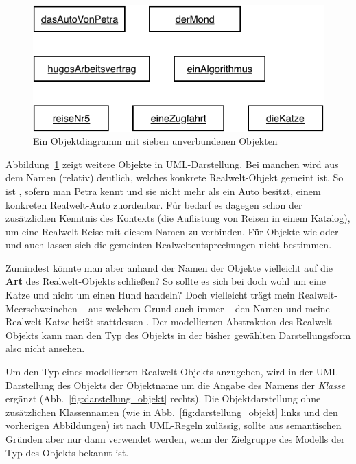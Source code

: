 \vspace{2mm} %

\begin{figure}[h!]
	\centering
	\includegraphics{Bilder/Kapitel-4/objektdiagramm_unverbundene_objekte.pdf}
	\caption{Ein Objektdiagramm mit sieben unverbundenen Objekten}
	\label{fig:objektdiagramm_unverbundene_objekte}
\end{figure}

Abbildung~\ref{fig:objektdiagramm_unverbundene_objekte} zeigt weitere Objekte in UML-Darstellung. Bei manchen wird aus dem Namen (relativ) deutlich, welches konkrete Realwelt-Objekt gemeint ist. So ist \linebreak {}, sofern man Petra kennt und sie nicht mehr als ein Auto besitzt, einem konkreten Realwelt-Auto zuordenbar. Für  bedarf es dagegen schon der zusätzlichen Kenntnis des Kontexts (\zb die Auflistung von Reisen in einem Katalog), um eine Realwelt-Reise mit diesem Namen zu verbinden. Für Objekte wie  oder  und auch  lassen sich die gemeinten Realweltentsprechungen nicht bestimmen. 

Zumindest könnte man aber anhand der Namen der Objekte vielleicht auf die \textbf{Art} des Realwelt-Objekts schließen? So sollte es sich bei  doch wohl um eine Katze und nicht um einen Hund handeln? Doch vielleicht trägt mein Realwelt-Meerschweinchen – aus welchem Grund auch immer – den Namen  und meine Realwelt-Katze heißt stattdessen . Der modellierten Abstraktion des Realwelt-Objekts kann man den Typ des Objekts in der bisher gewählten Darstellungsform also nicht ansehen. 

Um den Typ eines modellierten Realwelt-Objekts anzugeben, wird in der UML-Dar\-stel\-lung des Objekts der Objektname um die Angabe des Namens der \textit{Klasse}
ergänzt (Abb.~\ref{fig:darstellung_objekt} rechts). Die Objektdarstellung ohne zusätzlichen Klassennamen (wie in Abb.~\ref{fig:darstellung_objekt} links und den vorherigen Abbildungen) ist nach UML-Regeln zulässig, sollte aus semantischen Gründen aber nur dann verwendet werden, wenn der Zielgruppe des Modells der Typ des Objekts bekannt ist.

